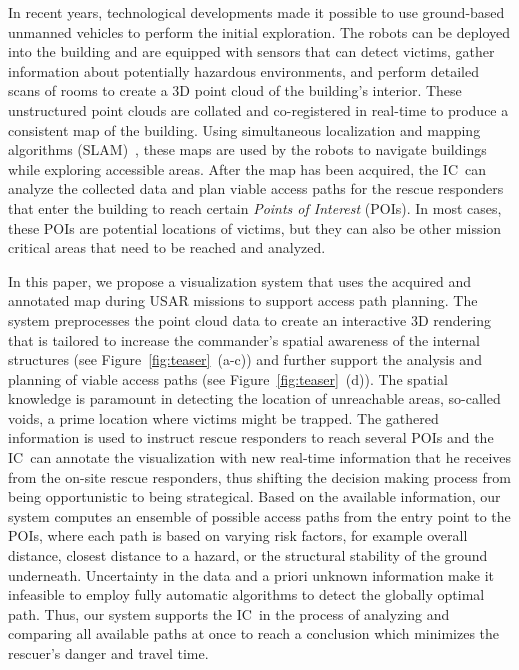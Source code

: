 \documentclass[conference,10pt,letter]{IEEEtran}
\def\IC{IC}
\begin{document}
In recent years, technological developments made it possible to use ground-based unmanned vehicles to perform the initial exploration. The robots can be deployed into the building and are equipped with sensors that can detect victims, gather information about potentially hazardous environments, and perform detailed scans of rooms to create a 3D point cloud of the building's interior. These unstructured point clouds are collated and co-registered in real-time to produce a consistent map of the building. Using simultaneous localization and mapping algorithms (SLAM)~\cite{Dissanayake01asolution, Ziparo459917}, these maps are used by the robots to navigate buildings while exploring accessible areas. After the map has been acquired, the \IC\ can analyze the collected data and plan viable access paths for the rescue responders that enter the building to reach certain \emph{Points of Interest} (POIs). In most cases, these POIs are potential locations of victims, but they can also be other mission critical areas that need to be reached and analyzed.

In this paper, we propose a visualization system that uses the acquired and annotated map during USAR missions to support access path planning. The system preprocesses the point cloud data to create an interactive 3D rendering that is tailored to increase the commander's spatial awareness of the internal structures (see Figure~\ref{fig:teaser}~(a-c)) and further support the analysis and planning of viable access paths (see Figure~\ref{fig:teaser}~(d)). The spatial knowledge is paramount in detecting the location of unreachable areas, so-called voids, a prime location where victims might be trapped. The gathered information is used to instruct rescue responders to reach several POIs and the \IC\ can annotate the visualization with new real-time information that he receives from the on-site rescue responders, thus shifting the decision making process from being opportunistic to being strategical. Based on the available information, our system computes an ensemble of possible access paths from the entry point to the POIs, where each path is based on varying risk factors, for example overall distance, closest distance to a hazard, or the structural stability of the ground underneath. Uncertainty in the data and a priori unknown information make it infeasible to employ fully automatic algorithms to detect the globally optimal path. Thus, our system supports the \IC\ in the process of analyzing and comparing all available paths at once to reach a conclusion which minimizes the rescuer's danger and travel time.
\end{document}

